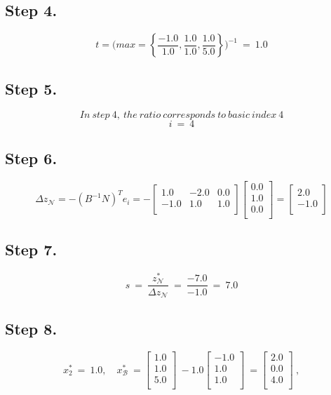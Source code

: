 \subsection{Step 4.}
\[
t =\Bigg(
max= \left\{\frac{-1.0}{1.0},\frac{1.0}{1.0},\frac{1.0}{5.0}\right\}
\Bigg)^{-1}\ =\ 1.0
\]
\subsection{Step 5.}
\[
In\ step\ 4, \ the\ ratio\ corresponds\ to\ basic\ index\ 4
\]
\[
i\ = \ 4
\]
\subsection{Step 6.}
\[
\Delta z_{\mathcal N}= -( B^{-1} N )^{T}e_i = -\begin{bmatrix}
1.0 & -2.0 & 0.0 \\ -1.0 & 1.0 & 1.0 \\ 
\end{bmatrix}
\begin{bmatrix}
0.0 \\ 1.0 \\ 0.0 \\ 
\end{bmatrix}
= \begin{bmatrix}
2.0 \\ -1.0 \\ 
\end{bmatrix}
\]
\subsection{Step 7.}
\[
s \ =\ \frac{z_{\mathcal N}^{*}}{ \Delta z_{\mathcal N}}\ =\ \frac{-7.0}{-1.0}\ =\ 7.0
\]
\subsection{Step 8.}
\[
x_{2}^{*}\ =\ 1.0, \quad x_{\mathcal B}^{*}\ =\begin{bmatrix}
1.0 \\ 1.0 \\ 5.0 \\ 
\end{bmatrix}\ -1.0\begin{bmatrix}
-1.0 \\ 1.0 \\ 1.0 \\ 
\end{bmatrix}\ =\begin{bmatrix}
2.0 \\ 0.0 \\ 4.0 \\ 
\end{bmatrix}\ ,
\]
\

